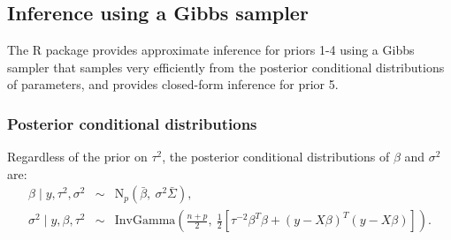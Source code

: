 \documentclass[nojss]{jss}
\begin{document}
\subsection{Inference using a Gibbs sampler}

The R package  provides approximate inference for priors 1-4 using
a Gibbs sampler that samples very efficiently from the posterior conditional
distributions of parameters, and provides closed-form inference for prior 5.

\subsubsection{Posterior conditional distributions}

Regardless of the prior on $\tau^{2}$, the posterior conditional distributions of
$\beta$ and $\sigma^2$ are:
\begin{eqnarray*}
\beta\mid y, \tau^{2},\sigma^2 &\sim& \mathrm{N}_p\left( \bar{\beta},\  \sigma^2 \bar{\Sigma} \right),\\
\sigma^2\mid y, \beta,\tau^{2} &\sim& \mathrm{InvGamma} \left( \frac{n+p}{2},\ \frac{1}{2} \left[ \tau^{-2} \beta^T \beta + \left( y-X\beta\right)^T \left( y-X\beta\right) \right] \right).
\end{eqnarray*}
\end{document}
